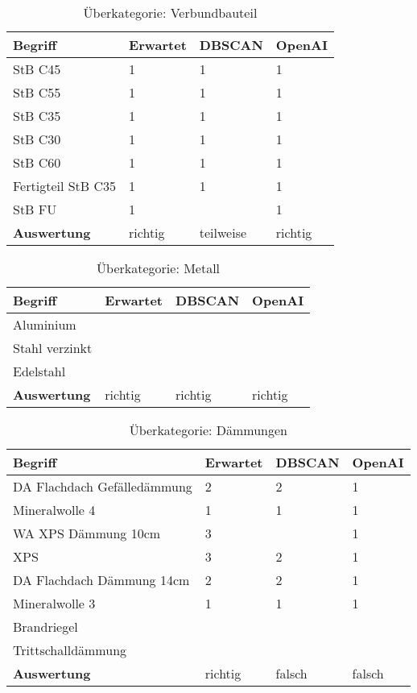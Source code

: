 \begin{table}[h]
	
	\centering
	\begin{tabular}{|l|l|l|l|}
		\hline
		\textbf{Begriff} & \textbf{Erwartet} & \textbf{DBSCAN} & \textbf{OpenAI}\\ \hline
		 StB C45 & 1 & 1 & 1 \\ \hline
		StB C55 & 1 & 1 & 1 \\ \hline
		StB C35 & 1 & 1 & 1 \\ \hline
		StB C30 & 1 & 1 & 1 \\ \hline
		StB C60 & 1 & 1 & 1 \\ \hline
		Fertigteil StB C35 & 1 & 1 & 1 \\ \hline
		StB FU & 1 & ~ & 1 \\ \hline
		\textbf{Auswertung} & richtig & teilweise & richtig \\ \hline
	\end{tabular}
	\caption{Überkategorie: Verbundbauteil}
	\label{t:evaluation-example11}
\end{table}

\begin{table}[h]
	
	\centering
	\begin{tabular}{|l|l|l|l|}
		\hline
		\textbf{Begriff} & \textbf{Erwartet} & \textbf{DBSCAN} & \textbf{OpenAI}\\ \hline
		 Aluminium & ~ & ~ & ~ \\ \hline
		Stahl verzinkt & ~ & ~ & ~ \\ \hline
		Edelstahl  & ~ & ~ & ~ \\ \hline
		\textbf{Auswertung} & richtig & richtig & richtig\\ \hline
	\end{tabular}
	\caption{Überkategorie: Metall}
	\label{t:evaluation-example12}
\end{table}

\begin{table}[h]
	
	\centering
	\begin{tabular}{|l|l|l|l|}
		\hline
		\textbf{Begriff} & \textbf{Erwartet} & \textbf{DBSCAN} & \textbf{OpenAI}\\ \hline
		  DA Flachdach Gefälledämmung & 2 & 2 & 1 \\ \hline
		Mineralwolle 4 & 1 & 1 & 1 \\ \hline
		WA XPS Dämmung 10cm & 3 & ~ & 1 \\ \hline
		XPS & 3 & 2 & 1 \\ \hline
		DA Flachdach Dämmung 14cm & 2 & 2 & 1 \\ \hline
		Mineralwolle 3 & 1 & 1 & 1 \\ \hline
		Brandriegel & ~ & ~ & ~ \\ \hline
		Trittschalldämmung  & ~ & ~ & ~ \\ \hline
		\textbf{Auswertung} & richtig & falsch & falsch \\ \hline
	\end{tabular}
	\caption{Überkategorie: Dämmungen}
	\label{t:evaluation-example13}
\end{table}

